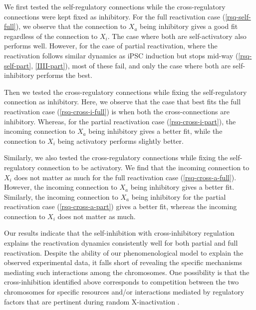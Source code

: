 \documentclass[11pt,a4paper]{article}
\renewcommand{\cite}{\parencite}
\begin{document}
We first tested the self-regulatory connections while the cross-regulatory connections were kept fixed as inhibitory. For the full reactivation case (\autoref{rsq-self-full}), we observe that the connection to $X_a$ being inhibitory gives a good fit regardless of the connection to $X_i$. The case where both are self-activatory also performs well. However, for the case of partial reactivation, where the reactivation follows similar dynamics as iPSC induction but stops mid-way (\autoref{rsq-self-part}, \autoref{IIII-part}), most of these fail, and only the case where both are self-inhibitory performs the best.

Then we tested the cross-regulatory connections while fixing the self-regulatory connection as inhibitory. Here, we observe that the case that best fits the full reactivation case (\autoref{rsq-cross-i-full}) is when both the cross-connections are inhibitory. Whereas, for the partial reactivation case (\autoref{rsq-cross-i-part}), the incoming connection to  $X_a$ being inhibitory gives a better fit, while the connection to $X_i$ being activatory performs slightly better.

Similarly, we also tested the cross-regulatory connections while fixing the self-regulatory connection to be activatory. We find that the incoming connection to $X_i$ does not matter as much for the full reactivation case (\autoref{rsq-cross-a-full}). However, the incoming connection to $X_a$ being inhibitory gives a better fit. Similarly, the incoming connection to $X_a$ being inhibitory for the partial reactivation case (\autoref{rsq-cross-a-part}) gives a better fit, whereas the incoming connection to $X_i$ does not matter as much.


Our results indicate that the self-inhibition with cross-inhibitory regulation explains the reactivation dynamics consistently well for both partial and full reactivation. Despite the ability of our phenomenological model to explain the observed experimental data, it falls short of revealing the specific mechanisms mediating such interactions among the chromosomes. One possibility is that the cross-inhibition identified above corresponds to competition between the two chromosomes for specific resources and/or interactions mediated by regulatory factors that are pertinent during random X-inactivation \cite{XCI}.
\end{document}
